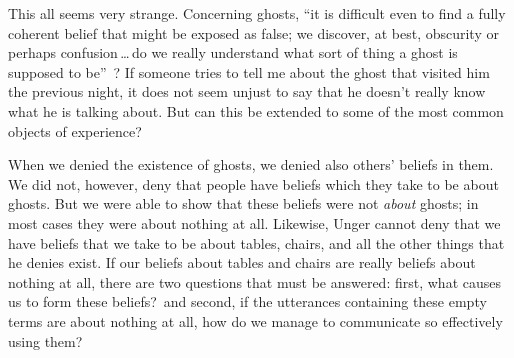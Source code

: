 \documentclass[11pt]{article}
\begin{document}
\begin{spacing}{1.5}
This all seems very strange. Concerning ghosts, ``it is difficult even to find a fully coherent belief that might be exposed as false; we discover, at best, obscurity or perhaps confusion\,\ldots\,do we really understand what sort of thing a ghost is supposed to be''~\citep[76]{stroud2000a}? If someone tries to tell me about the ghost that visited him the previous night, it does not seem unjust to say that he doesn't really know what he is talking about. But can this be extended to some of the most common objects of experience?

When we denied the existence of ghosts, we denied also others' beliefs in them. We did not, however, deny that people have beliefs which they take to be about ghosts. But we were able to show that these beliefs were not {\em about} ghosts; in most cases they were about nothing at all. Likewise, Unger cannot deny that we have beliefs that we take to be about tables, chairs, and all the other things that he denies exist. If our beliefs about tables and chairs are really beliefs about nothing at all, there are two questions that must be answered: first, what causes us to form these beliefs?\ and second, if the utterances containing these empty terms are about nothing at all, how do we manage to communicate so effectively using them?


\end{spacing}
\end{document}
